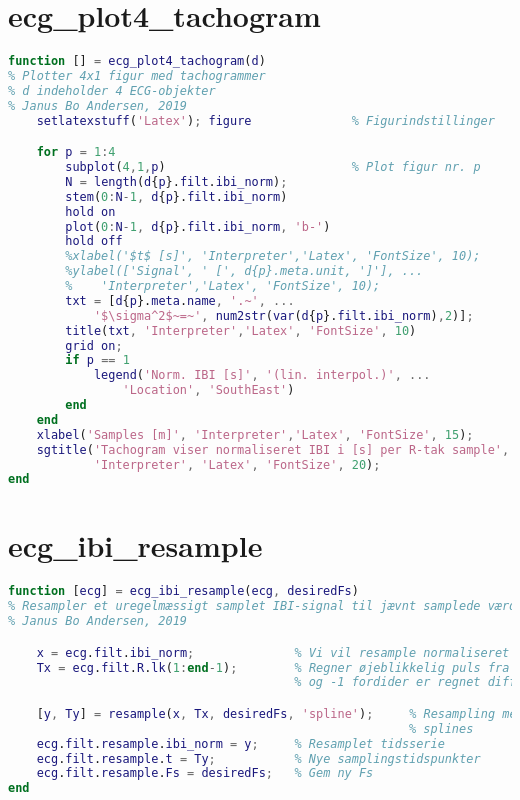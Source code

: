 \documentclass[a4paper]{report}
\begin{document}
\section{ecg\_plot4\_tachogram}

        
\begin{lstlisting}[language=Matlab, style=Matlab-editor]
function [] = ecg_plot4_tachogram(d)
% Plotter 4x1 figur med tachogrammer
% d indeholder 4 ECG-objekter
% Janus Bo Andersen, 2019
    setlatexstuff('Latex'); figure              % Figurindstillinger

    for p = 1:4
        subplot(4,1,p)                          % Plot figur nr. p
        N = length(d{p}.filt.ibi_norm);
        stem(0:N-1, d{p}.filt.ibi_norm)
        hold on
        plot(0:N-1, d{p}.filt.ibi_norm, 'b-')
        hold off
        %xlabel('$t$ [s]', 'Interpreter','Latex', 'FontSize', 10);
        %ylabel(['Signal', ' [', d{p}.meta.unit, ']'], ...
        %    'Interpreter','Latex', 'FontSize', 10);
        txt = [d{p}.meta.name, '.~', ...
            '$\sigma^2$~=~', num2str(var(d{p}.filt.ibi_norm),2)];
        title(txt, 'Interpreter','Latex', 'FontSize', 10)
        grid on;
        if p == 1
            legend('Norm. IBI [s]', '(lin. interpol.)', ...
                'Location', 'SouthEast')
        end
    end
    xlabel('Samples [m]', 'Interpreter','Latex', 'FontSize', 15);
    sgtitle('Tachogram viser normaliseret IBI i [s] per R-tak sample', ...
            'Interpreter', 'Latex', 'FontSize', 20);
end
\end{lstlisting}



\section{ecg\_ibi\_resample}

        
\begin{lstlisting}[language=Matlab, style=Matlab-editor]
function [ecg] = ecg_ibi_resample(ecg, desiredFs)
% Resampler et uregelmæssigt samplet IBI-signal til jævnt samplede værdier
% Janus Bo Andersen, 2019

    x = ecg.filt.ibi_norm;              % Vi vil resample normaliseret IBI
    Tx = ecg.filt.R.lk(1:end-1);        % Regner øjeblikkelig puls fra m=0
                                        % og -1 fordider er regnet diff.

    [y, Ty] = resample(x, Tx, desiredFs, 'spline');     % Resampling med
                                                        % splines
    ecg.filt.resample.ibi_norm = y;     % Resamplet tidsserie
    ecg.filt.resample.t = Ty;           % Nye samplingstidspunkter
    ecg.filt.resample.Fs = desiredFs;   % Gem ny Fs
end
\end{lstlisting}
\end{document}
